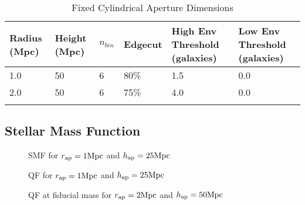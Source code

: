 \documentclass{emulateapj}
\begin{document}
%
%


\appendix
\begin{table*} %
  \caption{Fixed Cylindrical Aperture Dimensions}
  \label{tab:aperture}
  \begin{center}
    \leavevmode
    \begin{tabular}{llllll} \hline \hline              
  Radius (Mpc)          &Height (Mpc)      &$n_{bin}$   &Edgecut &High Env Threshold (galaxies) &Low Env Threshold (galaxies) \\ \hline 
  1.0 &50 &6 & 80\% & 1.5 & 0.0          \\
  2.0 &50 &6 & 75\% & 4.0 & 0.0          \\ \hline
  \multicolumn{6}{l}{}                                             \\       
    \end{tabular}
  \end{center}
\end{table*}

\subsection{Stellar Mass Function} \label{sec:smf_const}
\begin{figure*}
    \begin{center}
        \leavevmode
        \label{fig:smf}
        \caption{SMF for $r_{\rm{ap}}=1 \rm{Mpc}$ and $h_{\rm{ap}}=25 \rm{Mpc}$}
    \end{center}
\end{figure*}

\begin{figure*}
    \begin{center}
        \leavevmode
        \label{fig:smf}
        \caption{QF for $r_{\rm{ap}}=1 \rm{Mpc}$ and $h_{\rm{ap}}=25 \rm{Mpc}$}
    \end{center}
\end{figure*}

\begin{figure*}
    \begin{center}
        \leavevmode
        \label{fig:qf}
        \caption{QF at fiducial mass for $r_{\rm{ap}}=2 \rm{Mpc}$ and $h_{\rm{ap}}=50 \rm{Mpc}$}
    \end{center}
\end{figure*}
\end{document}
